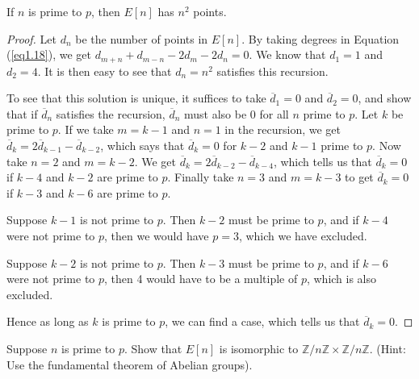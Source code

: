 \begin{coro}
\label{c1.8.8}
If $n$ is prime to $p$, then $E[n]$ has $n^{2}$ points.
\end{coro}

\begin{proof} Let $d_{n}$ be the number of points in $E[n]$. By taking degrees in Equation (\ref{eq1.18}), we get $d_{m+n}+d_{m-n}-2d_{m}-2d_{n}=0$. We know that $d_{1}=1$ and $d_{2}=4$. It is then easy to see that $d_{n}=n^{2}$ satisfies this recursion.

To see that this solution is unique, it suffices to take $\overline{d}_{1}=0$ and $\overline{d}_{2}=0$, and show that if $\overline{d}_{n}$ satisfies the recursion, $\overline{d}_{n}$ must also be $0$ for all $n$ prime to $p$. Let $k$ be prime to $p$. If we take $m=k-1$ and $n=1$ in the recursion, we get $\overline{d}_{k}=2\overline{d}_{k-1}-\overline{d}_{k-2}$, which says that $\overline{d}_{k}=0$ for $k-2$ and $k-1$ prime to $p$. Now take $n=2$ and $m=k-2$. We get $\overline{d}_{k}=2\overline{d}_{k-2}-\overline{d}_{k-4}$, which tells us that $\overline{d}_{k}=0$ if $k-4$ and $k-2$ are prime to $p$. Finally take $n=3$ and $m=k-3$ to get $\overline{d}_{k}=0$ if $k-3$ and $k-6$ are prime to $p$.

Suppose $k-1$ is not prime to $p$. Then $k-2$ must be prime to $p$, and if $k-4$ were not prime to $p$, then we would have $p=3$, which we have excluded.

Suppose $k-2$ is not prime to $p$. Then $k-3$ must be prime to $p$, and if $k-6$ were not prime to $p$, then 4 would have to be a multiple of $p$, which is also excluded.

Hence as long as $k$ is prime to $p$, we can find a case, which tells us that $\overline{d}_{k}=0$.
\end{proof}

\begin{exo}
\label{e8.8}
Suppose $n$ is prime to $p$. Show that $E[n]$ is isomorphic to $\mathbb{Z}/n\mathbb{Z} \times \mathbb{Z}/n\mathbb{Z}$. (Hint: Use the fundamental theorem of Abelian groups).
\end{exo}

